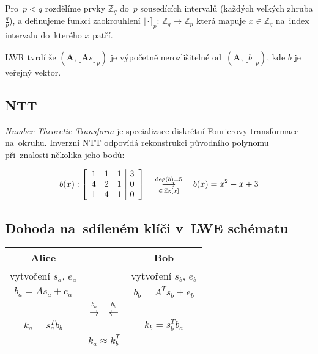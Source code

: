 Pro~$p < q$ rozdělíme prvky $\mathbb{Z}_q$ do~$p$ sousedících intervalů (každých velkých zhruba $\frac{q}{p}$), a definujeme funkci zaokrouhlení $\lfloor \cdot \rceil_p$: $\mathbb{Z}_q \rightarrow \mathbb{Z}_p$ která mapuje $x \in \mathbb{Z}_q$ na~index intervalu do~kterého $x$ patří.

LWR tvrdí že $(\textbf{A}, \lfloor \textbf{A}s \rfloor_p)$ je výpočetně nerozlišitelné od~$(\textbf{A}, \lfloor b \rceil_p)$, kde $b$ je veřejný vektor.


\subsection{NTT}
\label{sec:ntt}

\emph{Number Theoretic Transform} je specializace diskrétní Fourierovy transformace na~okruhu.
Inverzní NTT odpovídá rekonstrukci původního polynomu při~znalosti několika jeho bodů:

$$
b(x):
\left[\begin{array}{ccc|c}
1 & 1 & 1 & 3 \\ 4 & 2 & 1 & 0 \\ 1 & 4 & 1 & 0 \\
\end{array}\right]
\hspace*{1em}
\mathrel{\mathop{\longrightarrow}^{\text{deg}(b)=5}_{\in \, \mathbb{Z}_5[x]}}
\hspace*{1em}
b(x) = x^2 - x + 3
$$


\subsection{Dohoda na~sdíleném klíči v~LWE schématu}

\begin{table}[ht]
    \centering
    \begin{tabular}{ccc}
    Alice & & Bob \\
    \hline
    vytvoření $s_a$, $e_a$ & & vytvoření $s_b$, $e_b$ \\
    $b_a = As_a + e_a$ & & $b_b = A^Ts_b + e_b$ \\
    & $\stackrel{b_a}{\longrightarrow} \ \ \stackrel{b_b}{\longleftarrow}$ & \\
    $k_a = s_a^T b_b$ & & $k_b = s_b^T b_a$ \\
    & $k_a \approx k_b^T$ & \\
    \end{tabular}
\end{table}
\FloatBarrier

